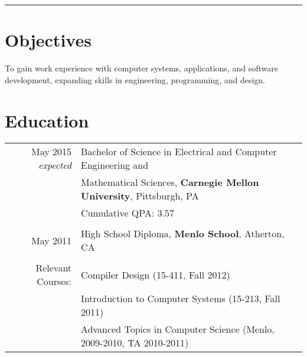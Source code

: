 \documentclass[10pt]{article}
\begin{document}
\pagestyle{empty}
\par{\bigskip\par}
\hrule
\par{\par}

\section{Objectives}
To gain work experience with computer systems, applications, and software development, expanding skills in engineering, programming, and design.

\section{Education}
\begin{tabular}{rl}
May 2015 {\em expected} & Bachelor of Science in Electrical and Computer Engineering and
\\ & Mathematical Sciences, \textbf{Carnegie Mellon University}, Pittsburgh, PA\\
& Cumulative QPA: 3.57 \\
 &\\
May 2011 & High School Diploma,
\textbf{Menlo School}, Atherton, CA\\
 &\\
Relevant Courses: & Compiler Design (15-411, Fall 2012) \\
& Introduction to Computer Systems (15-213, Fall 2011) \\
& Advanced Topics in Computer Science (Menlo, 2009-2010, TA 2010-2011) \\\end{tabular}
\end{document}
